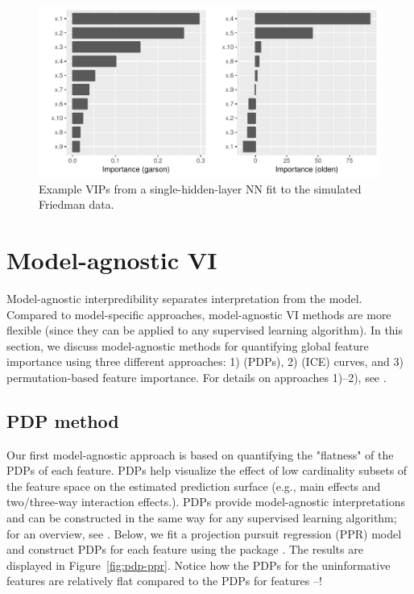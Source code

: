 \begin{figure}[!htb]
  \centering 
  \includegraphics[width=1\linewidth]{figures/vip-model-nn} 
  \caption{Example VIPs from a single-hidden-layer NN fit to the simulated Friedman data.}
  \label{fig:vip-earth}
\end{figure}


\section{Model-agnostic VI}

Model-agnostic interpredibility separates interpretation from the model. Compared to model-specific approaches, model-agnostic VI methods are more flexible (since they can be applied to any supervised learning algorithm). In this section, we discuss model-agnostic methods for quantifying global feature importance using three different approaches: 1)  (PDPs), 2)  (ICE) curves, and 3) permutation-based feature importance. For details on approaches 1)--2), see \citet{greenwell-simple-2018}.


\subsection{PDP method}

Our first model-agnostic approach is based on quantifying the "flatness" of the PDPs of each feature. PDPs help visualize the effect of low cardinality subsets of the feature space on the estimated prediction surface (e.g., main effects and two/three-way interaction effects.). PDPs provide model-agnostic interpretations and can be constructed in the same way for any supervised learning algorithm; for an overview, see \citet{greenwell-pdp-2017}. Below, we fit a projection pursuit regression (PPR) model and construct PDPs for each feature using the  package \citet{greenwell-pdp-2017}. The results are displayed in Figure~\ref{fig:pdp-ppr}. Notice how the PDPs for the uninformative features are relatively flat compared to the PDPs for features --!

